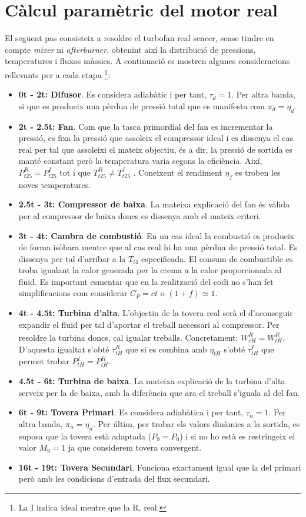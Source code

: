 \section{Càlcul paramètric del motor real}
\label{motoreal}
El següent pas consisteix a resoldre el turbofan real sencer, sense tindre en compte \textit{mixer} ni \textit{afterburner}, obtenint així la distribució de pressions, temperatures i fluxos màssics. A continuació es mostren algunes consideracions rellevants per a cada etapa \footnote{La I indica ideal mentre que la R, real.}:
\begin{itemize}
\item \textbf{0t - 2t: Difusor}. Es considera adiabàtic i per tant, $\tau_d = 1$. Per altra banda, si que es produeix una pèrdua de pressió total que es manifesta com $\pi_d = \eta_d$.
\item \textbf{2t - 2.5t: Fan}. Com que la tasca primordial del fan es incrementar la pressió, es fixa la pressió que assoleix el compressor ideal i es dissenya el cas real per tal que assoleixi el mateix objectiu, és a dir, la pressió de sortida es manté constant però la temperatura varia segons la eficiència. Així, $P_{t25}^R = P_{t25}^I$ tot i que $T_{t25}^R \neq T_{t25}^I$ . Coneixent el rendiment $\eta_f$ es troben les noves temperatures.
\item \textbf{2.5t - 3t: Compressor de baixa}. La mateixa explicació del fan és vàlida per al compressor de baixa doncs es dissenya amb el mateix criteri.
\item \textbf{3t - 4t: Cambra de combustió}. En un cas ideal la combustió es produeix de forma isòbara mentre que al cas real hi ha una pèrdua de pressió total. Es dissenya per tal d'arribar a la $T_{t4}$ especificada. El consum de combustible es troba igualant la calor generada per la crema a la calor proporcionada al fluid. Es important esmentar que en la realització del codi no s'han fet simplificacions com considerar $C_P=ct$ o $(1+f)\simeq1$.
\item \textbf{4t - 4.5t: Turbina d'alta}. L'objectiu de la tovera real serà el d'aconseguir expandir el fluid per tal d'aportar el treball necessari al compressor. Per resoldre la turbina doncs, cal igualar treballs. Concretament: $\dot{W_{cH}^R} = \dot{W_{tH}^R} $. D'aquesta igualtat s'obté $\tau_{tH}^R$ que si es combina amb $\eta_{tH}$ s'obté $\tau_{tH}^I$ que permet trobar  $P_{tH}^{I} = P_{tH}^{R}$.
\item \textbf{4.5t - 6t: Turbina de baixa}. La mateixa explicació de la turbina d'alta serveix per la de baixa, amb la diferència que ara el treball s'iguala al del fan.
\item \textbf{6t - 9t: Tovera Primari}. Es considera adiabàtica i per tant, $\tau_n = 1$. Per altra banda, $\pi_n = \eta_n$. Per últim, per trobar els valors dinàmics a la sortida, es suposa que la tovera està adaptada ($P_9 = P_0$) i si no ho està es restringeix el valor $M_9=1$ ja que considerem tovera convergent.
\item \textbf{16t - 19t: Tovera Secundari}. Funciona exactament igual que la del primari però amb les condicions d'entrada del flux secundari.
\end{itemize}
